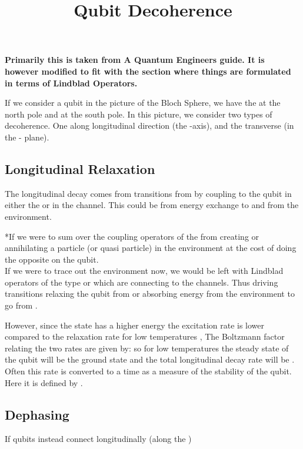 \documentclass[
]{article}
\title{Qubit Decoherence}
\author{}
\date{}
\begin{document}
\maketitle

\textbf{Primarily this is taken from A Quantum Engineers guide. It is
however modified to fit with the section where things are formulated in
terms of Lindblad Operators.}

If we consider a qubit in the picture of the Bloch Sphere, we have the
{} at the north pole and {} at the south pole. In this picture, we
consider two types of decoherence. One along longitudinal direction (the
{}-axis), and the transverse (in the {} - plane).

\hypertarget{longitudinal-relaxation}{%
\subsection{Longitudinal Relaxation}\label{longitudinal-relaxation}}

The longitudinal decay comes from transitions from {} by coupling to the
qubit in either the {} or in the {} channel. This could be from energy
exchange to and from the environment.

*If we were to sum over the coupling operators of the from creating or
annihilating a particle (or quasi particle) in the environment at the
cost of doing the opposite on the qubit.\\
{}If we were to trace out the environment now, we would be left with
Lindblad operators of the type {} or {} which are connecting to the
{}channels. Thus driving transitions relaxing the qubit from {} or
absorbing energy from the environment to go from {}.

However, since the state {} has a higher energy {} the excitation rate
{} is lower compared to the relaxation rate {} for low temperatures {},
The Boltzmann factor relating the two rates are given by: {} so for low
temperatures {} the steady state of the qubit will be the ground state
and the total longitudinal decay rate will be {}. Often this rate is
converted to a time as a measure of the stability of the qubit. Here it
is defined by {}.

\hypertarget{dephasing}{%
\subsection{Dephasing}\label{dephasing}}

If qubits instead connect longitudinally (along the {})
\end{document}
